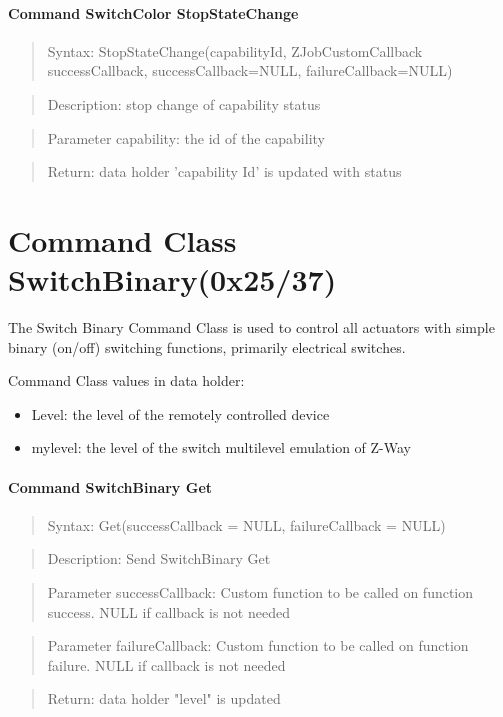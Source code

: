 \paragraph {Command SwitchColor StopStateChange}
\begin{quote} Syntax: StopStateChange(capabilityId, ZJobCustomCallback successCallback, successCallback=NULL, failureCallback=NULL)\end{quote}
\begin{quote} Description: stop change of capability status\end{quote}
\begin{quote} Parameter capability: the id of the capability\end{quote}
\begin{quote} Return: data holder 'capability Id' is updated with status \end{quote}




\section{Command Class SwitchBinary(0x25/37)}

The Switch Binary Command Class is used to control all actuators with simple binary (on/off) switching functions, primarily electrical switches. 

Command Class values in data holder:
\begin{itemize}
\item Level: the level of the remotely controlled device
\item mylevel:  the level of the switch multilevel emulation of Z-Way
\end{itemize}

\paragraph {Command SwitchBinary Get}
\begin{quote} Syntax: Get(successCallback = NULL, failureCallback = NULL)\end{quote}
\begin{quote} Description: Send SwitchBinary Get\end{quote}
\begin{quote} Parameter successCallback: Custom function to be called on function success. NULL if callback is not needed\end{quote}
\begin{quote} Parameter failureCallback: Custom function to be called on function failure. NULL if callback is not needed\end{quote}
\begin{quote} Return: data holder "level" is updated\end{quote}

